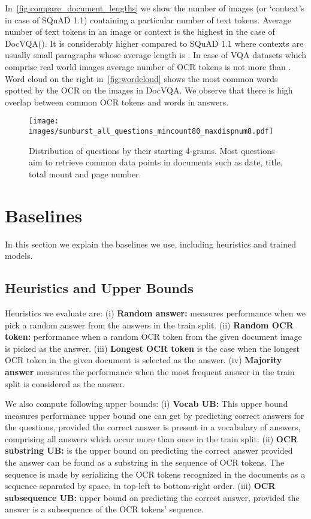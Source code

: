 \documentclass[10pt,twocolumn,letterpaper]{article}
\newcommand{\datasetName}{DocVQA\xspace}
\newcommand{\squad}{SQuAD 1.1\xspace}
\begin{document}
In~\autoref{fig:compare_document_lengths} we show the number of images (or `context's in case of \squad) containing a particular number of text tokens. 
Average number of text tokens in an image or context is the highest in the case of \datasetName (). It is considerably  higher compared to \squad where contexts are usually small paragraphs whose average length is . In case of VQA datasets which comprise real world images average number of OCR tokens is not more than . Word cloud on the right in~\autoref{fig:wordcloud} shows the most common words spotted by the OCR on the images in \datasetName. We observe that there is high overlap between common OCR tokens and words in answers.
\begin{figure}[t]
    \centering
    \texttt{[image: images/sunburst\_all\_questions\_mincount80\_maxdispnum8.pdf]}
    \caption{Distribution of questions by  their starting 4-grams. Most questions aim to retrieve common data points in documents such as date, title, total mount and page number. }
    \label{fig:sunburst_4grams}
    \vspace{-5mm}

\end{figure}




\section{Baselines}
\label{sec:baselines}
In  this section we  explain the baselines we use, including heuristics and trained models. 

\subsection{Heuristics and Upper Bounds}
\label{sec:heuristics}
Heuristics we evaluate are: (i) \textbf{Random answer:} measures performance when we pick a random answer from the answers in the train split. (ii) \textbf{Random OCR token:} performance when a random OCR token from the given document image is picked as the answer. (iii) \textbf{Longest OCR token} is the case when the longest OCR token in the given document is selected as the answer. (iv) \textbf{Majority answer} measures the performance when the most frequent answer in the train split is considered as the answer.

We also compute following upper bounds: (i) \textbf{Vocab UB:} This upper bound measures performance upper bound one can get by predicting correct answers for the questions, provided the correct answer is present in a vocabulary of answers, comprising all answers which occur more than once in the train split.
(ii) \textbf{OCR substring UB:} is the upper bound on predicting the correct answer provided the answer can be found as a substring in the sequence of OCR tokens.
The  sequence is made by serializing the OCR tokens recognized in the documents as a sequence separated by space, in top-left to bottom-right order.
(iii) \textbf{OCR subsequence UB:} upper bound on predicting the correct answer, provided the answer is a subsequence of the OCR tokens' sequence.
\end{document}
